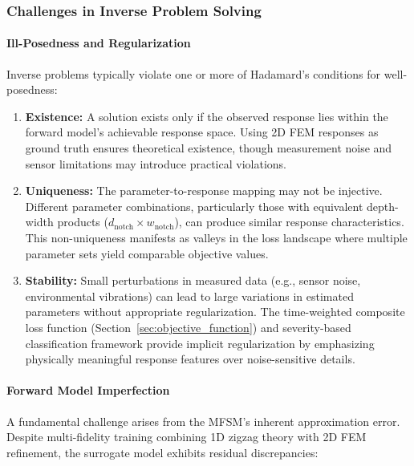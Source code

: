 \documentclass[12pt,a4paper]{report}
\begin{document}
\subsubsection{Challenges in Inverse Problem Solving}

\paragraph{Ill-Posedness and Regularization}
Inverse problems typically violate one or more of Hadamard's conditions for well-posedness:

\begin{enumerate}
    \item \textbf{Existence:} A solution exists only if the observed response lies within the forward model's achievable response space. Using 2D FEM responses as ground truth ensures theoretical existence, though measurement noise and sensor limitations may introduce practical violations.

    \item \textbf{Uniqueness:} The parameter-to-response mapping may not be injective. Different parameter combinations, particularly those with equivalent depth-width products ($d_{\text{notch}} \times w_{\text{notch}}$), can produce similar response characteristics. This non-uniqueness manifests as valleys in the loss landscape where multiple parameter sets yield comparable objective values.

    \item \textbf{Stability:} Small perturbations in measured data (e.g., sensor noise, environmental vibrations) can lead to large variations in estimated parameters without appropriate regularization. The time-weighted composite loss function (Section~\ref{sec:objective_function}) and severity-based classification framework provide implicit regularization by emphasizing physically meaningful response features over noise-sensitive details.
\end{enumerate}

\paragraph{Forward Model Imperfection}
A fundamental challenge arises from the MFSM's inherent approximation error. Despite multi-fidelity training combining 1D zigzag theory with 2D FEM refinement, the surrogate model exhibits residual discrepancies:
\end{document}
